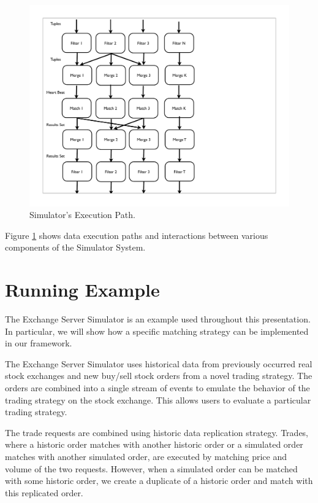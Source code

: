\documentclass{article}
\begin{document}
\begin{figure}
  \includegraphics[width=4.50in]{figures/ExchangeFigure.pdf}
  \caption{Simulator's Execution Path.}
  \label{fig:overview}
\end{figure}

Figure \ref{fig:overview} shows data execution paths and interactions between various components of the Simulator System.

\section{Running Example}

The Exchange Server Simulator is an example used throughout this presentation. In particular, we will show how a specific matching strategy can be implemented in our framework.

The Exchange Server Simulator uses historical data from previously occurred real stock exchanges and new  buy/sell stock orders from a novel trading strategy. The orders are combined into a single stream of events to emulate the behavior of the trading strategy on the stock exchange. This allows users to evaluate a particular trading strategy. 

The trade requests are combined using historic data replication strategy. Trades, where a historic order matches with another historic order or a simulated order matches with another simulated order, are executed by matching price and volume of the two requests. However, when a simulated order can be matched with some historic order, we create a duplicate of a historic order and match with this replicated order.
\end{document}

